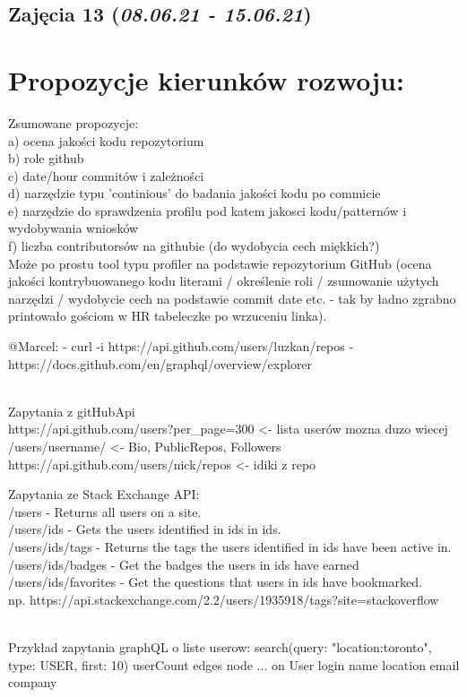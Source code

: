 \documentclass[graybox]{svmult}
\begin{document}
\subsection{Zajęcia 13 (\emph{08.06.21 - 15.06.21})}

\newpage

\section{Propozycje kierunków rozwoju:}
Zsumowane propozycje: \\
 a) ocena jakości kodu repozytorium \\
 b) role github \\
 c) date/hour commitów i zależności \\ 
 d) narzędzie typu 'continious' do badania jakości kodu po commicie \\ 
 e) narzędzie do sprawdzenia profilu pod katem jakosci kodu/patternów i wydobywania wniosków \\
 f) liczba contributorsów na githubie (do wydobycia cech miękkich?) \\ 

Może po prostu tool typu profiler na podstawie repozytorium GitHub (ocena jakości kontrybuowanego kodu literami / określenie roli / zsumowanie użytych narzędzi / wydobycie cech na podstawie commit date etc. - tak by ładno zgrabno printowało gościom w HR tabeleczke po wrzuceniu linka).

@Marcel:
 - curl -i https://api.github.com/users/luzkan/repos
 - https://docs.github.com/en/graphql/overview/explorer
 
 \\Zapytania z gitHubApi
 \\https://api.github.com/users?per\_page=300 <- lista userów mozna duzo wiecej
 \\ /users/{username}/ <- Bio, PublicRepos, Followers
 \\ https://api.github.com/users/{nick}/repos <- idiki z repo
 
Zapytania ze Stack Exchange API:\\
/users - Returns all users on a site.\\
/users/{ids} - Gets the users identified in ids in {ids}.\\
/users/{ids}/tags - Returns the tags the users identified in {ids} have been active in.\\
/users/{ids}/badges - Get the badges the users in {ids} have earned\\
/users/{ids}/favorites - Get the questions that users in {ids} have bookmarked.\\

np. https://api.stackexchange.com/2.2/users/1935918/tags?site=stackoverflow

\\
Przykład zapytania graphQL o liste userow:
{
  search(query: "location:toronto", type: USER, first: 10) {
    userCount
    edges {
      node {
        ... on User {
          login
          name
          location
          email
          company
        }
      }
    }
  }
}





%
\end{document}
